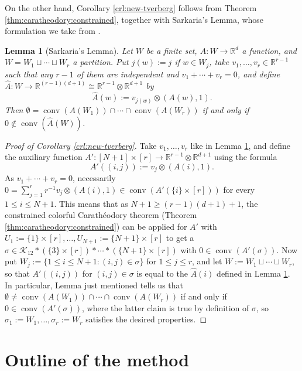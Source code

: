 \documentclass[a4paper,11pt,reqno, english]{amsart}
\newtheorem{lemma}[theorem]{Lemma}
\theoremstyle{definition}
\theoremstyle{remark}
\newcommand\R{\mathbb R}
\DeclareMathOperator{\conv}{\mathrm{conv}}
\begin{document}
On the other hand, Corollary \ref{crl:new-tverberg} follows from Theorem \ref{thm:caratheodory:constrained}, together with Sarkaria's Lemma, whose formulation we take from \cite[Lemma 13.1]{Barany2021}. 
\begin{lemma}[Sarkaria's Lemma]\label{lem:sarkaria}
    Let $W$ be a finite set, $A\colon W\to\R^d$ a function, and $W=W_1\sqcup\cdots\sqcup W_r$ a partition. Put $j(w):=j$ if $w\in W_j$, take $v_1,\ldots,v_r\in\R^{r-1}$ such that any $r-1$ of them are independent and $v_1+\cdots+v_r=0$, and define $\hat{A}\colon W\to\R^{(r-1)(d+1)}\cong\R^{r-1}\otimes\R^{d+1}$ by
    \[
        \hat{A}(w):=v_{j(w)}\otimes
        (A(w),1).
    \] 
    Then $\emptyset=\conv(A(W_1))\cap\cdots\cap\conv(A(W_r))$ if and only if $0\notin\conv(\hat{A}({W}))$. 
\end{lemma}
\begin{proof}[Proof of Corollary \ref{crl:new-tverberg}]
    Take $v_1,\ldots,v_r$ like in Lemma \ref{lem:sarkaria}, and define the auxiliary function $A'\colon {[N+1]\times[r]}\to\R^{r-1}\otimes\R^{d+1}$ using the formula
    \[
        A'((i,j)):=v_{j}\otimes
        (A(i),1).
    \]
    As $v_1+\cdots+v_r=0$, necessarily 
    $0=\sum_{j=1}^rr^{-1}v_j\otimes(A(i),1)\in\conv(A'(\{i\}\times [r]))$ 
    for every $1\leq i\leq N+1$. This means that as $N+1\geq (r-1)(d+1)+1$, the constrained colorful Carath\'eodory theorem (Theorem \ref{thm:caratheodory:constrained}) can be applied for $A'$ with $U_1:=\{1\}\times[r],\ldots,U_{N+1}:=\{N+1\}\times[r]$ to get a $\sigma\in\mathscr{K}_{12}*(\{3\}\times[r])*\cdots*(\{N+1\}\times[r])$ with $0\in\conv(A'(\sigma))$. Now put $W_j:=\{1\leq i\leq N+1:(i,j)\in\sigma\}$ for $1\leq j\leq r$, and let $W:=W_1\sqcup\cdots\sqcup W_r$, so that $A'((i,j))$ for $(i,j)\in \sigma$ is equal to the $\hat{A}(i)$ defined in Lemma \ref{lem:sarkaria}. In particular, Lemma just mentioned tells us that $\emptyset\neq\conv(A(W_1))\cap\cdots\cap\conv(A(W_r))$ if and only if $0\in\conv(A'(\sigma))$, where the latter claim is true by definition of $\sigma$, so $\sigma_1:=W_1,\ldots,\sigma_r:=W_r$ satisfies the desired properties.
\end{proof}


\bigskip
\section{Outline of the method}\label{sec:the-method}
\bigskip
\end{document}
